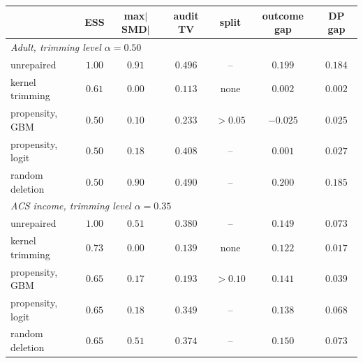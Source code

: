 \begin{tabular}{lcccccc}
\toprule
& ESS & max$|$SMD$|$ & audit TV & split & outcome gap & DP gap \\
\midrule
\multicolumn{7}{l}{\emph{Adult, trimming level $\alpha=0.50$}} \\
\quad unrepaired & $1.00$ & $0.91$ & $0.496$ & -- & $0.199$ & $0.184$ \\
\quad kernel trimming & $0.61$ & $0.00$ & $0.113$ & none & $0.002$ & $0.002$ \\
\quad propensity, GBM & $0.50$ & $0.10$ & $0.233$ & $>0.05$ & $-0.025$ & $0.025$ \\
\quad propensity, logit & $0.50$ & $0.18$ & $0.408$ & -- & $0.001$ & $0.027$ \\
\quad random deletion & $0.50$ & $0.90$ & $0.490$ & -- & $0.200$ & $0.185$ \\
\multicolumn{7}{l}{\emph{ACS income, trimming level $\alpha=0.35$}} \\
\quad unrepaired & $1.00$ & $0.51$ & $0.380$ & -- & $0.149$ & $0.073$ \\
\quad kernel trimming & $0.73$ & $0.00$ & $0.139$ & none & $0.122$ & $0.017$ \\
\quad propensity, GBM & $0.65$ & $0.17$ & $0.193$ & $>0.10$ & $0.141$ & $0.039$ \\
\quad propensity, logit & $0.65$ & $0.18$ & $0.349$ & -- & $0.138$ & $0.068$ \\
\quad random deletion & $0.65$ & $0.51$ & $0.374$ & -- & $0.150$ & $0.073$ \\
\bottomrule
\end{tabular}
